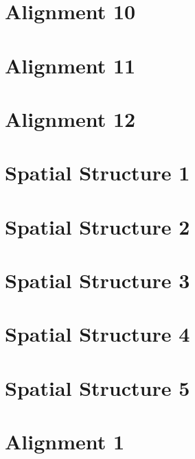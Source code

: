 \documentclass{scrartcl}
\begin{document}
\section{Alignment 10}
\label{sec:align_10}
\clearpage

\section{Alignment 11}
\label{sec:align_11}
\clearpage

\section{Alignment 12}
\label{sec:align_12}
\clearpage



\section{Spatial Structure 1}
\label{sec:spatial_1}
\clearpage

\section{Spatial Structure 2}
\label{sec:spatial_2}
\clearpage

\section{Spatial Structure 3}
\label{sec:spatial_3}
\clearpage

\section{Spatial Structure 4}
\label{sec:spatial_4}
\clearpage

\section{Spatial Structure 5}
\label{sec:spatial_5}
\clearpage


\section{Alignment 1}
\label{sec:alignment_12d_1}
\clearpage
\end{document}
